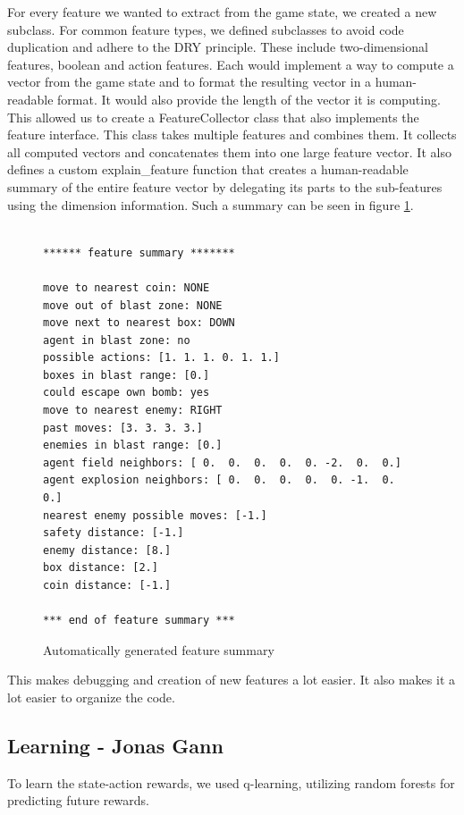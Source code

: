 \documentclass{article}
\begin{document}
For every feature we wanted to extract from the game state, we created a new subclass. For common feature types, we defined subclasses to avoid code duplication and adhere to the DRY principle. These include two-dimensional features, boolean and action features. Each would implement a way to compute a vector from the game state and to format the resulting vector in a human-readable format. It would also provide the length of the vector it is computing. This allowed us to create a FeatureCollector class that also implements the feature interface. This class takes multiple features and combines them. It collects all computed vectors and concatenates them into one large feature vector. It also defines a custom explain\_feature function that creates a human-readable summary of the entire feature vector by delegating its parts to the sub-features using the dimension information. Such a summary can be seen in figure \ref{feature_summary}.

\begin{figure}[h]
\centering
\begin{verbatim}
    
****** feature summary *******

move to nearest coin: NONE
move out of blast zone: NONE
move next to nearest box: DOWN
agent in blast zone: no
possible actions: [1. 1. 1. 0. 1. 1.]
boxes in blast range: [0.]
could escape own bomb: yes
move to nearest enemy: RIGHT
past moves: [3. 3. 3. 3.]
enemies in blast range: [0.]
agent field neighbors: [ 0.  0.  0.  0.  0. -2.  0.  0.]
agent explosion neighbors: [ 0.  0.  0.  0.  0. -1.  0.  0.]
nearest enemy possible moves: [-1.]
safety distance: [-1.]
enemy distance: [8.]
box distance: [2.]
coin distance: [-1.]

*** end of feature summary ***
\end{verbatim}
\caption{Automatically generated feature summary}
\label{feature_summary}
\end{figure}

This makes debugging and creation of new features a lot easier. It also makes it a lot easier to organize the code.

\subsection[Learning]{Learning {\small - Jonas Gann}}

To learn the state-action rewards, we used q-learning, utilizing random forests for predicting future rewards.
\end{document}
